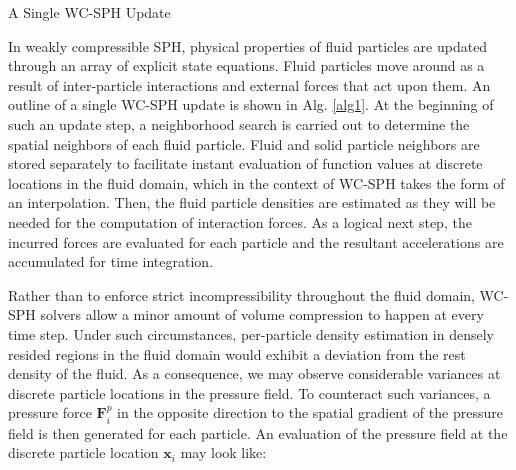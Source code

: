 \documentclass[
	11pt, 
	DIV10,
	ngerman,
	a4paper, 
	oneside, 
	headings=normal, 
	captions=tableheading,
	final, 
	numbers=noenddot
]{scrartcl}
\begin{document}
\medskip
\begin{algorithm}[H]
	\DontPrintSemicolon
	\SetAlgoLined
	\caption{\label{alg1} A Single WC-SPH Update}
\end{algorithm}
\medskip

In weakly compressible SPH, physical properties of fluid particles are updated through an array of explicit state equations. Fluid particles move around as a result of inter-particle interactions and external forces that act upon them. An outline of a single WC-SPH update is shown in Alg. \ref{alg1}. At the beginning of such an update step, a neighborhood search is carried out to determine the spatial neighbors of each fluid particle. Fluid and solid particle neighbors are stored separately to facilitate instant evaluation of function values at discrete locations in the fluid domain, which in the context of WC-SPH takes the form of an interpolation. Then, the fluid particle densities are estimated as they will be needed for the computation of interaction forces. As a logical next step, the incurred forces are evaluated for each particle and the resultant accelerations are accumulated for time integration.

Rather than to enforce strict incompressibility throughout the fluid domain, WC-SPH solvers allow a minor amount of volume compression to happen at every time step. Under such circumstances, per-particle density estimation in densely resided regions in the fluid domain would exhibit a deviation from the rest density of the fluid. As a consequence, we may observe considerable variances at discrete particle locations in the pressure field. To counteract such variances, a pressure force $ \mathbf{F}_{i}^{p} $ in the opposite direction to the spatial gradient of the pressure field is then generated for each particle. An evaluation of the pressure field at the discrete particle location $ \boldsymbol{x}_{i} $ may look like:
\end{document}
